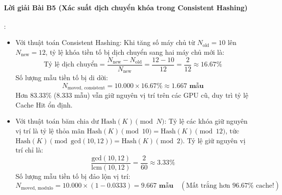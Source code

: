 \paragraph{Lời giải Bài B5 (Xác suất dịch chuyển khóa trong Consistent Hashing)}:
\begin{itemize}
  \item[a)] Với thuật toán Consistent Hashing:
  Khi tăng số máy chủ từ $N_{\text{old}} = 10$ lên $N_{\text{new}} = 12$, tỷ lệ khóa tiền tố bị dịch chuyển sang hai máy chủ mới là:
  \begin{equation*}
  \text{Tỷ lệ dịch chuyển} = \frac{N_{\text{new}} - N_{\text{old}}}{N_{\text{new}}} = \frac{12 - 10}{12} = \frac{2}{12} \approx 16.67\%
  \end{equation*}
  Số lượng mẫu tiền tố bị di dời:
  \begin{equation*}
  N_{\text{moved, consistent}} = 10.000 \times 16.67\% \approx \mathbf{1.667\text{ mẫu}}
  \end{equation*}
  Hơn $83.33\%$ ($8.333$ mẫu) vẫn giữ nguyên vị trí trên các GPU cũ, duy trì tỷ lệ Cache Hit ổn định.

  \item[b)] Với thuật toán băm chia dư $\text{Hash}(K) \pmod N$:
  Tỷ lệ các khóa giữ nguyên vị trí là tỷ lệ thỏa mãn $\text{Hash}(K) \pmod{10} = \text{Hash}(K) \pmod{12}$, tức $\text{Hash}(K) \pmod{\text{gcd}(10, 12)} = \text{Hash}(K) \pmod 2$.
  Tỷ lệ giữ nguyên vị trí chỉ là:
  \begin{equation*}
  \frac{\text{gcd}(10, 12)}{\text{lcm}(10, 12)} = \frac{2}{60} \approx 3.33\%
  \end{equation*}
  Số lượng mẫu tiền tố bị đảo lộn vị trí:
  \begin{equation*}
  N_{\text{moved, modulo}} = 10.000 \times (1 - 0.0333) = \mathbf{9.667\text{ mẫu}} \quad (\text{Mất trắng hơn } 96.67\% \text{ cache!})
  \end{equation*}
\end{itemize}

